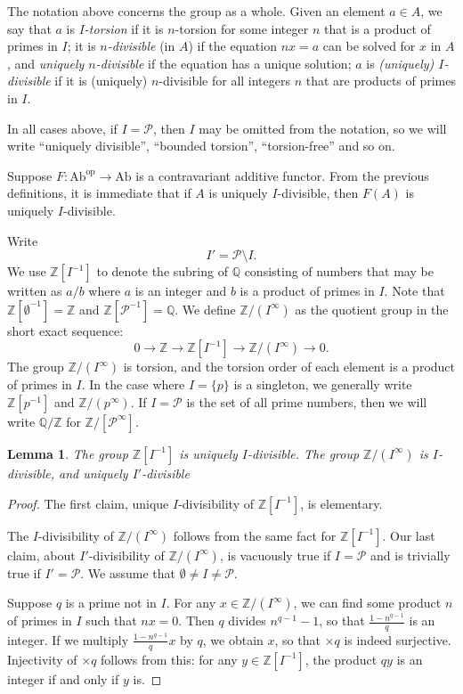 \documentclass[11pt, oneside, dvipsnames, svgnames, table, final]{amsart}
\newcommand{\mathbx}[1]{\mathbb{#1}}
\theoremstyle{plain}
\newtheorem{lemma}[thm]{Lemma}
\theoremstyle{definition}
\theoremstyle{remark}
\newcommand{\Q}{\mathbx{Q}}
\newcommand{\Z}{\mathbx{Z}}
\newcommand{\sh}[1]{\mathcal{#1}}
\newcommand{\op}{\text{op}}
\newcommand{\sm}{\setminus}
\newcommand{\Ab}{\mathrm{Ab}}
\newcommand{\<}[1]{{\langle}#1 {\rangle}}
\newcommand{\Zpinf}{\Z/\left(p^\infty\right)}
\newcommand{\ZIinf}{\Z/\left(I^\infty\right)}
\begin{document}
The notation above concerns the group as a whole. Given an element $a \in A$, we say that $a$ is \emph{$I$-torsion} if it is $n$-torsion for some integer $n$ that is a product of primes in $I$; it is \emph{$n$-divisible} (in $A$) if the equation $nx=a$ can be solved for $x$ in $A$, and \emph{uniquely $n$-divisible} if the equation has a unique solution;  $a$ is \emph{(uniquely) $I$-divisible} if it is (uniquely) $n$-divisible for all integers $n$ that are products of primes in $I$.

In all cases above, if $I =\sh P$, then $I$ may be omitted from the notation, so we will write ``uniquely divisible'', ``bounded torsion'', ``torsion-free'' and so on.

Suppose $F: \Ab^\op \to \Ab$ is a contravariant additive functor. From the previous definitions, it is immediate that if $A$ is uniquely $I$-divisible, then $F(A)$ is uniquely $I$-divisible.

Write
\begin{equation*}
  I'=\sh P \sm I.
\end{equation*}
We use $\Z[I^{-1}]$ to denote the subring of $\Q$ consisting of numbers that may be written as $a/b$ where $a$ is an integer and $b$ is a product of primes in $I$. Note that $\Z[\emptyset^{-1}] =\Z$ and $\Z[\sh P^{-1}]=\Q$. We define $\ZIinf$ as the quotient group in the short exact sequence:
  \begin{equation}
    \label{eq:4}
    0 \to \Z \to \Z[I^{-1}] \to \ZIinf \to 0.
  \end{equation}
The group $\ZIinf$ is torsion, and the torsion order of each element is a product of primes in $I$. In the case where $I=\{p\}$ is a singleton, we generally write $\Z[p^{-1}]$ and $\Zpinf$. If $I = \sh P$ is the set of all prime numbers, then we will write  $\Q/\Z$ for $\Z/[\sh P^\infty]$.

\begin{lemma}\label{lem:wasBulletPoint}
 The group $\Z[I^{-1}]$ is uniquely $I$-divisible. The group $\ZIinf$ is $I$-divisible, and uniquely $I'$-divisible
\end{lemma}
\begin{proof}
  The first claim, unique $I$-divisibility of $\Z[I^{-1}]$, is elementary.

  The $I$-divisibility of $\ZIinf$ follows from the same fact for $\Z[I^{-1}]$. Our last claim, about $I'$-divisibility of $\ZIinf$, is vacuously true if $I = \sh P$ and is trivially true if $I' = \sh P$. We assume that $\emptyset \neq I \neq \sh P$.

  Suppose $q$ is a prime not in $I$. For any $x \in \ZIinf$, we can find some product $n$ of primes in $I$ such that $nx=0$. Then $q$ divides $n^{q-1}-1$, so that $\frac{1-n^{q-1}}{q}$ is an integer. If we multiply $\frac{1-n^{q-1}}{q}x$ by $q$, we obtain $x$, so that $\times q$ is indeed surjective. Injectivity of $\times q$ follows from this: for any $y \in \Z[I^{-1}]$, the product $qy$ is an integer if and only if $y$ is.
\end{proof}
\end{document}
